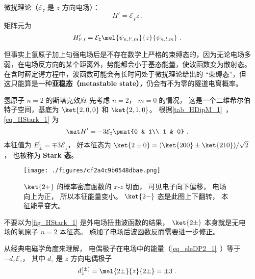 
\begin{issues}
\issueDraft
\end{issues}


微扰理论（$\mathcal{E_z}$ 是 $z$ 方向电场）：
\begin{equation}
H' = \mathcal{E_z} z~.
\end{equation}
矩阵元为
\begin{equation}\label{eq_HStark_1}
H'_{l',l} = \mathcal{E_z}\mel{\psi_{n,l',m}}{z}{\psi_{n,l,m}}~.
\end{equation}

但事实上氢原子加上匀强电场后是不存在数学上严格的束缚态的，因为无论电场多弱，在电场反方向的某个距离外，势能都会小于基态能量，使波函数变为散射态。在含时薛定谔方程中，波函数可能会有长时间处于微扰理论给出的 “束缚态”，但这只能算是一种\textbf{亚稳态（metastable state）}，仍会有不为零的隧道电离概率。

\begin{example}{氢原子 $n=2$ 的斯塔克效应}
先考虑 $n=2$， $m=0$ 的情况， 这是一个二维希尔伯特子空间，基底为 $\ket{2,0,0}$ 和 $\ket{2,1,0}$。 根据\autoref{tab_HDipM_1}~， \autoref{eq_HStark_1} 为
\begin{equation}
\mat H' = -3\mathcal{E_z}\pmat{0 & 1\\ 1 & 0}~.
\end{equation}
本征值为 $E_{\pm}^1 = \mp 3\mathcal{E_z}$， 好本征态为 $\ket{2\pm 0} = (\ket{200} \pm \ket{210})/{\sqrt 2}$， 也被称为 \textbf{Stark 态}。

\begin{figure}[ht]
\centering
\texttt{[image: ./figures/cf2a4c9b0548dbae.png]}
\caption{$\ket{2+}$ 的概率密度函数的 $x$-$z$ 切面， 可见电子向下偏移， 电场向上为正， 所以本征能量变小。 $\ket{2-}$ 态是此图上下翻转， 本征能量变大。} \label{fig_HStark_1}
\end{figure}

不要以为\autoref{fig_HStark_1} 是外电场扭曲波函数的结果， $\ket{2\pm}$ 本身就是无电场的氢原子 $n=2$ 本征态。 施加了电场后波函数反而需要进一步修正。

从经典电磁学角度来理解， 电偶极子在电场中的能量（\autoref{eq_eleDP2_1}~）等于 $-d_z \mathcal{E}_z$， 其中 $d_z$ 是 $z$ 方向电偶极子
\begin{equation}
d_z^{(\pm)} = \mel{2\pm}{z}{2\pm} = \pm 3~.
\end{equation}
\end{example}

